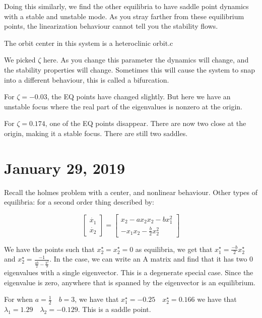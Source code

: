 \documentclass[11pt]{article}
\begin{document}
Doing this similarly, we find the other equilibria to have saddle point dynamics with a stable and unstable mode. As you stray farther from these equilibrium points, the linearization behaviour cannot tell you the stability flows.

The orbit center in this system is a heteroclinic orbit.c

We picked $\zeta$ here. As you change this parameter the dynamics will change, and the stability properties will change. Sometimes this will cause the system to snap into a different behaviour, this is called a bifurcation.

For $\zeta = -0.03$, the EQ points have changed slightly. But here we have an unstable focus where the real part of the eigenvalues is nonzero at the origin.

For $\zeta = 0.174$, one of the EQ points disappear. There are now two close at the origin, making it a stable focus. There are still two saddles.




\section*{January 29, 2019}
Recall the holmes problem with a center, and nonlinear behaviour. Other types of equilibria: for a second order thing described by:


\begin{equation}
\begin{bmatrix}
\dot{x_1} \\
\dot{x_2}
\end{bmatrix}
=
\begin{bmatrix}
x_2 -ax_2x_2 -bx_1^2\\
-x_1x_2 -\frac{b}{2}x_2^2
\end{bmatrix}
\end{equation}

We have the points such that $x_2^\star = x_2^\star = 0$ as equilibria, we get that $x_1^\star = \frac{-b}{2}x_2^\star$ and $x_2 ^\star = \frac{-1}{\frac{ab}{2} -\frac{b^3}{9}}$. In the case, we can write an A matrix and find that it has two 0 eigenvalues with a single eigenvector. This is a degenerate special case. Since the eigenvalue is zero, anywhere that is spanned by the eigenvector is an equilibrium. 

For when $a = \frac{1}{2}\quad b=3$, we have that $x_1^\star = -0.25 \quad x_2^\star = 0.166$ we have that $\lambda _1 = 1.29 \quad \lambda_2 = -0.129$. This is a saddle point.
\end{document}
